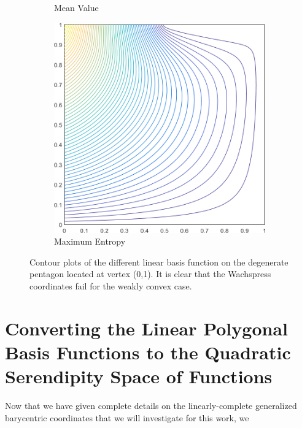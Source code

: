 \begin{figure}
{\begin{subfigure}[b]{0.39\textwidth}
		\caption{Mean Value}
	\end{subfigure}
	\hspace{1.5cm}
	\begin{subfigure}[b]{0.39\textwidth}
		\centering
		\includegraphics[width=\textwidth]{figures/sec_BF/deg_square_MAXENT1_contour_b5.png}
		\caption{Maximum Entropy}
	\end{subfigure}
}
\caption[Contour plots of the linear basis functions on the degenerate pentagon.]{Contour plots of the different linear basis function on the degenerate pentagon located at vertex (0,1). It is clear that the Wachspress coordinates fail for the weakly convex case.}
\end{figure}

\section{Converting the Linear Polygonal Basis Functions to the Quadratic Serendipity Space of Functions}
\label{sec::BF_2DQuadratic}

Now that we have given complete details on the linearly-complete generalized barycentric coordinates that we will investigate for this work, we 

